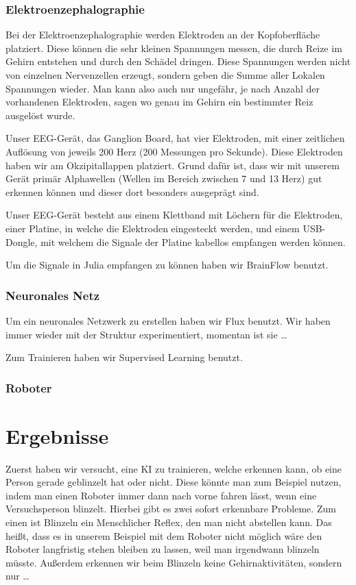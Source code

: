 \documentclass{scrartcl}
\begin{document}
	\subsubsection{Elektroenzephalographie}

	Bei der Elektroenzephalographie werden Elektroden an der Kopfoberfläche platziert. Diese können die sehr kleinen Spannungen messen, die durch Reize im Gehirn entstehen und durch den Schädel dringen. Diese Spannungen werden nicht von einzelnen Nervenzellen erzeugt, sondern geben die Summe aller Lokalen Spannungen wieder. Man kann also auch nur ungefähr, je nach Anzahl der vorhandenen Elektroden, sagen wo genau im Gehirn ein bestimmter Reiz ausgelöst wurde. 

	Unser EEG-Gerät, das Ganglion Board, hat vier Elektroden, mit einer zeitlichen Auflösung von jeweils 200 Herz (200 Messungen pro Sekunde). Diese Elektroden haben wir am Okzipitallappen platziert. Grund dafür ist, dass wir mit unserem Gerät primär Alphawellen (Wellen im Bereich zwischen 7 und 13 Herz) gut erkennen können und dieser dort besonders ausgeprägt sind. 

	Unser EEG-Gerät besteht aus einem Klettband mit Löchern für die Elektroden, einer Platine, in welche die Elektroden eingesteckt werden, und einem USB-Dongle, mit welchem die Signale der Platine kabellos empfangen werden können. 

	Um die Signale in Julia empfangen zu können haben wir BrainFlow benutzt.

	\subsubsection{Neuronales Netz}

	Um ein neuronales Netzwerk zu erstellen haben wir Flux benutzt. Wir haben immer wieder mit der Struktur experimentiert, momentan ist sie … 

	Zum Trainieren haben wir Supervised Learning benutzt.

	\subsubsection{Roboter}

	\section{Ergebnisse}

	Zuerst haben wir versucht, eine KI zu trainieren, welche erkennen kann, ob eine Person gerade geblinzelt hat oder nicht. Diese könnte man zum Beispiel nutzen, indem man einen Roboter immer dann nach vorne fahren lässt, wenn eine Versuchsperson blinzelt. Hierbei gibt es zwei sofort erkennbare Probleme. Zum einen ist Blinzeln ein Menschlicher Reflex, den man nicht abstellen kann. Das heißt, dass es in unserem Beispiel mit dem Roboter nicht möglich wäre den Roboter langfristig stehen bleiben zu lassen, weil man irgendwann blinzeln müsste. Außerdem erkennen wir beim Blinzeln keine Gehirnaktivitäten, sondern nur … 
\end{document}
